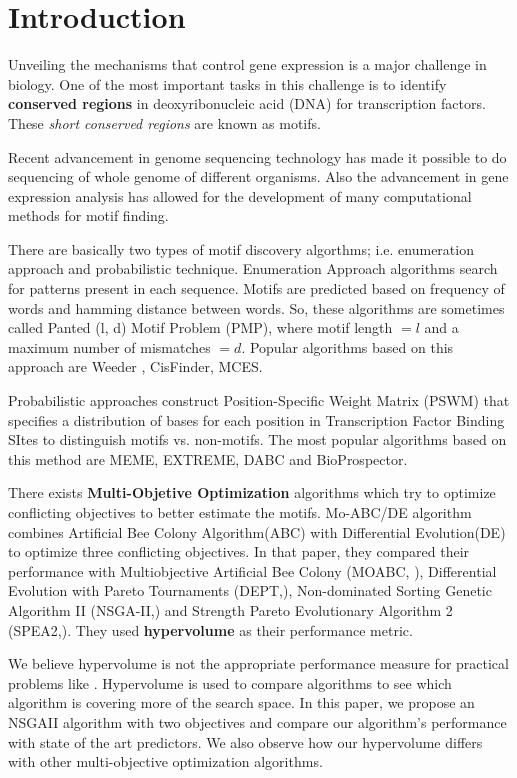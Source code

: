 \section{Introduction}
\label{sec:intro}
Unveiling the mechanisms that control gene expression is a major challenge in biology. One of the most important tasks in this challenge is to identify \textbf{conserved regions} in deoxyribonucleic acid (DNA) for transcription factors. These \textit{short conserved regions} are known as motifs.

Recent advancement in genome sequencing technology has made it possible to do sequencing of whole genome of different organisms. Also the advancement in gene expression analysis has allowed for the development of many computational methods for motif finding.

There are basically two types of motif discovery algorthms; i.e. enumeration approach and probabilistic technique\cite{hashim2019review}. Enumeration Approach algorithms search for patterns present in each sequence. Motifs are predicted based on frequency of words and hamming distance between words. So, these algorithms are sometimes called Panted (l, d) Motif Problem (PMP), where motif length $= l$ and a maximum number of mismatches $= d$. Popular algorithms based on this approach are Weeder \cite{zhang2016entropy}, CisFinder\cite{bailey2011dreme}, MCES\cite{jia2014new}.

Probabilistic approaches construct Position-Specific Weight Matrix (PSWM) that specifies a distribution of bases for each position in Transcription Factor Binding SItes to distinguish motifs vs. non-motifs\cite{hashim2019review}. The most popular algorithms based on this method are MEME\cite{sinha2003ymf}, EXTREME\cite{thomas2011rsat}, DABC\cite{karaboga2019discovery} and BioProspector\cite{pavesi2001algorithm}.

There exists \textbf{Multi-Objetive Optimization} algorithms which try to optimize conflicting objectives to better estimate the motifs. Mo-ABC/DE algorithm combines Artificial Bee Colony Algorithm(ABC) with Differential Evolution(DE) to optimize three conflicting objectives\cite{gonzalez2013hybrid}. In that paper, they compared their performance with Multiobjective Artificial Bee Colony (MOABC, \cite{gonzalez2013comparing}), Differential Evolution with Pareto Tournaments (DEPT,\cite{gonzalez2011predicting}), Non-dominated Sorting Genetic Algorithm II (NSGA-II,\cite{deb2002fast}) and Strength Pareto Evolutionary Algorithm 2 (SPEA2,\cite{zitzler2000improving}). They used \textbf{hypervolume} as their performance metric.

We believe hypervolume is not the appropriate performance measure for practical problems like . Hypervolume is used to compare algorithms to see which algorithm is covering more of the search space. In this paper, we propose an NSGAII algorithm with two objectives and compare our algorithm's performance with state of the art predictors. We also observe how our hypervolume differs with other multi-objective optimization algorithms.

